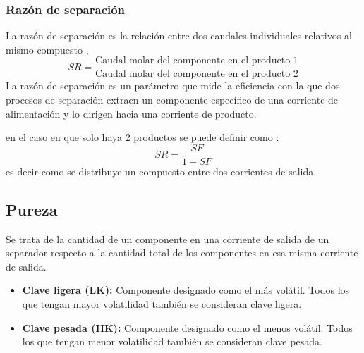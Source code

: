 \documentclass{report}
\begin{document}
\subsubsection{Razón de separación}
\begin{raggedright}
	La razón de separación es la relación entre dos caudales individuales relativos al mismo compuesto ,
	\begin{equation*}
		SR = \frac{\text{Caudal molar del componente en el producto 1}}{\text{Caudal molar del componente en el producto 2}}
	\end{equation*}
	La razón de separación es un parámetro que mide la eficiencia con la que dos procesos de separación extraen un componente específico de una corriente de alimentación y lo dirigen hacia una corriente de producto.
	
	en el caso en que solo haya 2 productos se puede definir como :
	\begin{equation*}
		SR = \frac{SF}{1-SF}
	\end{equation*}
	es decir como se distribuye un compuesto entre dos corrientes de salida.
\end{raggedright}
\subsection{Pureza}
\begin{raggedright}
    Se trata de la cantidad de un componente en una corriente de salida de un separador respecto a la cantidad total de los componentes en esa misma corriente de salida.

    \begin{itemize}
        \item[] \textbf{Clave ligera (LK):} Componente designado como el más volátil. Todos los que tengan mayor volatilidad también se consideran clave ligera.
        \item[] \textbf{Clave pesada (HK):} Componente designado como el menos volátil. Todos los que tengan menor volatilidad también se consideran clave pesada.
    \end{itemize}
\end{raggedright}
\end{document}
